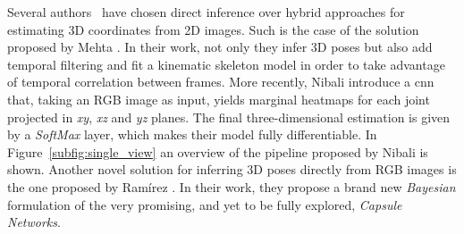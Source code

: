 Several authors~\cite{Nibali2019-yl, Luvizon2018-te, Pavlakos2017-qk, Nie2017-ud, Mehta2017-zi} have chosen direct inference over hybrid approaches for estimating 3D coordinates from 2D images. Such is the case of the solution proposed by Mehta \etal\cite{Mehta2017-zi}. In their work, not only they infer 3D poses but also add temporal filtering and fit a kinematic skeleton model in order to take advantage of temporal correlation between frames. More recently, Nibali \etal\cite{Nibali2019-yl} introduce a \gls{cnn} that, taking an RGB image as input, yields marginal heatmaps for each joint projected in \textit{xy}, \textit{xz} and \textit{yz} planes. The final three-dimensional estimation is given by a \emph{SoftMax} layer, which makes their model fully differentiable. In Figure~\ref{subfig:single_view} an overview of the pipeline proposed by Nibali \etal is shown. Another novel solution for inferring 3D poses directly from RGB images is the one proposed by Ramírez \etal\cite{ramirez2020bayesian}. In their work, they propose a brand new \emph{Bayesian} formulation of the very promising, and yet to be fully explored, \emph{Capsule Networks}.

